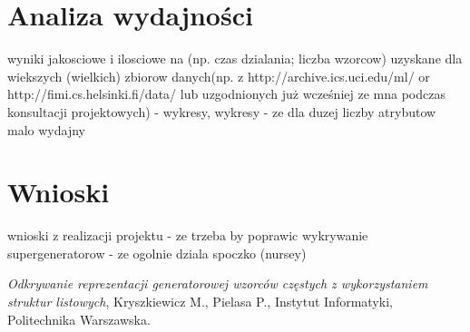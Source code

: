 \documentclass[a4paper,10pt]{article}
\begin{document}
\section{Analiza wydajności}
wyniki jakosciowe i ilosciowe na (np. czas dzialania; liczba wzorcow)
uzyskane dla wiekszych (wielkich) zbiorow danych(np. z
http://archive.ics.uci.edu/ml/ or http://fimi.cs.helsinki.fi/data/ lub
uzgodnionych już wcześniej ze mna podczas konsultacji projektowych)
- wykresy, wykresy
- ze dla duzej liczby atrybutow malo wydajny



\section{Wnioski}
wnioski z realizacji projektu
- ze trzeba by poprawic wykrywanie supergeneratorow
- ze ogolnie dziala spoczko (nursey)



\begin{thebibliography}{*}

  \emph{Odkrywanie reprezentacji generatorowej wzorców częstych z wykorzystaniem struktur listowych},
  Kryszkiewicz M., Pielasa P.,
  Instytut Informatyki,
  Politechnika Warszawska.


\end{thebibliography}
\end{document}
